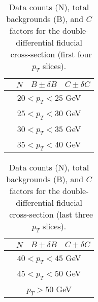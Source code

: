 \begin{table}
\footnotesize
  \begin{center}
\begin{tabular}{lccc}
\hline
    &   $N$   & $B \pm \delta B$  &  $C \pm \delta C$ \\
\hline

\hline
\multicolumn{4}{c}{$20 < p_T < 25$ GeV} \\
\hline


\hline
\multicolumn{4}{c}{$25 < p_T < 30$ GeV} \\
\hline


\hline
\multicolumn{4}{c}{$30 < p_T < 35$ GeV} \\
\hline


\hline
\multicolumn{4}{c}{$35 < p_T < 40$ GeV} \\
\hline


    \hline
    \end{tabular}
    \caption{ Data counts (N), total backgrounds (B), and $C$ factors for the double-differential fiducial \Wmunum\ cross-section (first four $p_T$ slices).}
    \label{tab:Wmn:NBC_NEG_2D_pt20_1}
  \end{center}
\end{table}

\begin{table}
\footnotesize
  \begin{center}
\begin{tabular}{lccc}
\hline
    &   $N$   & $B \pm \delta B$  &  $C \pm \delta C$ \\
\hline

\hline
\multicolumn{4}{c}{$40 < p_T < 45$ GeV} \\
\hline


\hline
\multicolumn{4}{c}{$45 < p_T < 50$ GeV} \\
\hline


\hline
\multicolumn{4}{c}{$p_T > 50$ GeV} \\
\hline


    \hline
    \end{tabular}
    \caption{ Data counts (N), total backgrounds (B), and $C$ factors for the double-differential fiducial \Wmunum\ cross-section (last three $p_T$ slices).}
    \label{tab:Wmn:NBC_NEG_2D_pt20_2}
  \end{center}
\end{table}

